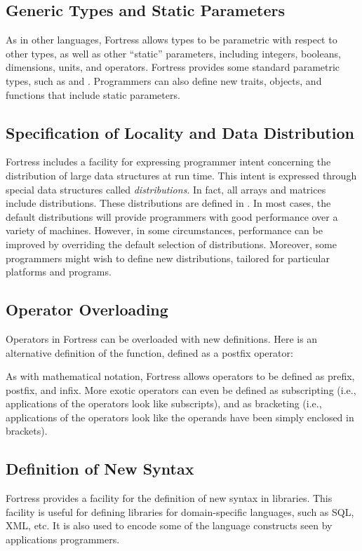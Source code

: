 \subsection{Generic Types and Static Parameters}
As in other languages, Fortress allows types to be parametric with respect to other types, as well as other ``static'' parameters,
including integers, booleans, dimensions, units, and operators.
Fortress provides some standard parametric types,
such as  and .
Programmers can also define new traits, objects, and functions that include static parameters.

\subsection{Specification of Locality and Data Distribution}
Fortress includes a facility for expressing programmer intent concerning the distribution of large data structures
at run time. This intent is expressed through special data structures called \emph{distributions}.
In fact, all arrays and matrices include distributions. These distributions
are defined in \library.
In most cases, the default distributions
will provide programmers with good performance over a variety of machines. However, in some circumstances,
performance can be improved by overriding the default selection of distributions.
Moreover, some programmers might wish to define new distributions, tailored for particular
platforms and programs.

\subsection{Operator Overloading}
Operators in Fortress can be overloaded with new definitions.
Here is an alternative definition of the  function, defined as a postfix operator:



As with mathematical notation, Fortress allows operators to be defined as prefix, postfix,
and infix. More exotic operators can even be defined as subscripting (i.e., applications of the
operators look like subscripts), and as bracketing (i.e., applications of the operators
look like the operands have been simply enclosed in brackets).

\subsection{Definition of New Syntax}
Fortress provides a facility for the definition of new syntax in libraries.
This facility is useful for defining libraries for domain-specific languages,
such
as SQL, XML, etc.
It is also used to encode some of
the language constructs seen by applications
programmers.
